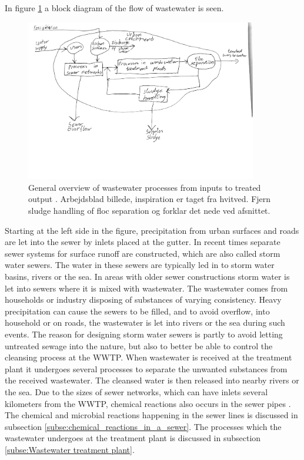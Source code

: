 In figure \ref{fig:sewer_overview_of_the_different_parts} a block diagram of the flow of wastewater is seen.
\begin{figure}[H]
\centering
\includegraphics[width=0.9\textwidth]{report/introduction/pictures/sewer_process2.pdf}
\caption{General overview of wastewater processes from inputs to treated output \cite{Sewer_processes}. Arbejdsblad billede, inspiration er taget fra hvitved. Fjern sludge handling of floc separation og forklar det nede ved afsnittet.}
\label{fig:sewer_overview_of_the_different_parts}
\end{figure}

Starting at the left side in the figure, precipitation from urban surfaces and roads are let into the sewer by inlets placed at the gutter. In recent times separate sewer systems for surface runoff are constructed, which are also called storm water sewers. The water in these sewers are typically led in to storm water basins, rivers or the sea. In areas with older sewer constructions storm water is let into sewers where it is mixed with wastewater. The wastewater comes from households or industry disposing of substances of varying consistency. Heavy precipitation can cause the sewers to be filled, and to avoid overflow, into household or on roads, the wastewater is let into rivers or the sea during such events. 
The reason for designing storm water sewers is partly to avoid letting untreated sewage into the nature, but also to better be able to control the cleansing process at the WWTP. %
When wastewater is received at the treatment plant it undergoes several processes to separate the unwanted substances from the received wastewater. The cleansed water is then released into nearby rivers or the sea.
Due to the sizes of sewer networks, which can have inlets several kilometers from the WWTP, chemical reactions also occurs in the sewer pipes \cite{Sewer_processes}.
The chemical and microbial reactions happening in the sewer lines is discussed in subsection \ref{subse:chemical_reactions_in_a_sewer}. The processes which the wastewater undergoes at the treatment plant is discussed in subsection \ref{subse:Wastewater treatment plant}.  

